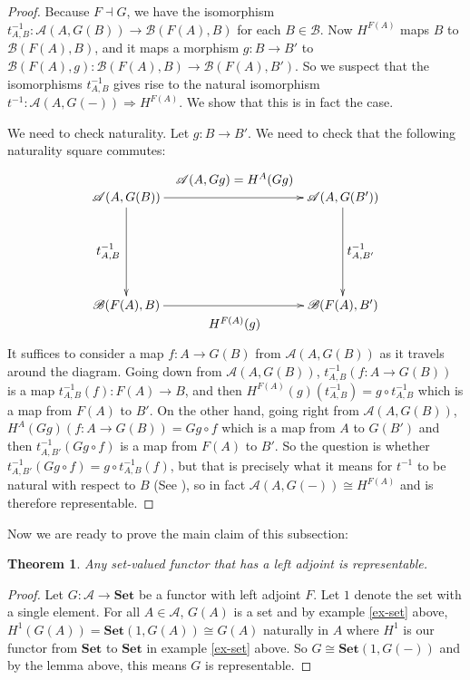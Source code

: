 \documentclass[11pt]{article}
\theoremstyle{definition}
\theoremstyle{definition}
\theoremstyle{plain}
\newtheorem{theo}{Theorem}
\theoremstyle{plain}
\theoremstyle{plain}
\begin{document}
\begin{proof}
Because $F \dashv G$, we have the isomorphism $t^{-1}_{A,B}: \mathscr{A}(A, G(B)) \to \mathscr{B}(F(A), B)$ for each $B \in \mathscr{B}$. Now $H^{F(A)}$ maps $B$ to $\mathscr{B}(F(A),B)$, and it maps a morphism $g: B \to B'$ to $\mathscr{B}(F(A),g):\mathscr{B}(F(A),B) \to \mathscr{B}(F(A),B')$. So we suspect that the isomorphisms $t^{-1}_{A,B}$ gives rise to the natural isomorphism $t^{-1}:\mathscr{A}(A,G(-)) \Rightarrow H^{F(A)}$. We show that this is in fact the case.

We need to check naturality. Let $g:B \to B'$. We need to check that the following naturality square commutes:

\begin{equation*}
\begin{xy}
(0,0)*+{\mathscr{A}(A, G(B))}="v1"; (60,0)*+{\mathscr{A}(A, G(B'))}="v2"; (0,-30)*+{\mathscr{B}(F(A), B)}="v3"; (60,-30)*+{\mathscr{B}(F(A), B')}="v4";
{\ar "v1";"v2"}?*!/_5mm/{\mathscr{A}(A, Gg)=H^{A}(Gg)};
{\ar "v1";"v3"}?*!/^5mm/{t^{-1}_{A,B}};
{\ar "v2";"v4"}?*!/_5mm/{t^{-1}_{A,B'}};
{\ar "v3";"v4"}?*!/^5mm/{H^{F(A)}(g)};
\end{xy}
\end{equation*}

It suffices to consider a map $f: A \to G(B)$ from $\mathscr{A}(A,G(B))$ as it travels around the diagram. Going down from $\mathscr{A}(A,G(B))$, $t^{-1}_{A,B}(f:A \to G(B))$ is a map $t^{-1}_{A,B}(f):F(A) \to B$, and then $H^{F(A)}(g)(t^{-1}_{A,B}) = g \circ t^{-1}_{A,B}$ which is a map from $F(A)$ to $B'$. On the other hand, going right from $\mathscr{A}(A,G(B))$, $H^{A}(Gg)(f:A \to G(B)) = Gg \circ f$ which is a map from $A$ to $G(B')$ and then $t^{-1}_{A,B'}(Gg \circ f)$ is a map from $F(A)$ to $B'$. So the question is whether $t^{-1}_{A,B'}(Gg \circ f) = g \circ t^{-1}_{A,B}(f)$, but that is precisely what it means for $t^{-1}$ to be natural with respect to $B$ (See \cite{liu_adjoints_2018}), so in fact $\mathscr{A}(A,G(-)) \cong H^{F(A)}$ and is therefore representable.
\end{proof}

Now we are ready to prove the main claim of this subsection:

\begin{theo}
Any set-valued functor that has a left adjoint is representable.
\end{theo}

\begin{proof}
Let $G:\mathscr{A}\to\textbf{Set}$ be a functor with left adjoint $F$. Let $1$ denote the set with a single element. For all $A \in \mathscr{A}$, $G(A)$ is a set and by example \ref{ex-set} above, $H^{1}(G(A)) = \textbf{Set}(1, G(A)) \cong G(A)$ naturally in $A$ where $H^{1}$ is our functor from $\textbf{Set}$ to $\textbf{Set}$ in example \ref{ex-set} above. So $G \cong \textbf{Set}(1, G(-))$ and by the lemma above, this means $G$ is representable.
\end{proof}
\end{document}
